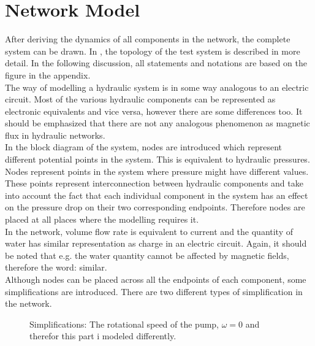 \section{Network Model}  
\label{SystemModel}

After deriving the dynamics of all components in the network, the complete system can be drawn. In , the topology of the test system is described in more detail. In the following discussion, all statements and notations are based on the figure in the appendix. 
\\
The way of modelling a hydraulic system is in some way analogous to an electric circuit. Most of the various hydraulic components can be represented as electronic equivalents and vice versa, however there are some differences too. It should be emphasized that there are not any analogous phenomenon as magnetic flux in hydraulic networks. 
\\
In the block diagram of the system, nodes are introduced which represent different potential points in the system. This is equivalent to hydraulic pressures. Nodes represent points in the system where pressure might have different values. These points represent interconnection between hydraulic components and take into account the fact that each individual component in the system has an effect on the pressure drop on their two corresponding endpoints. Therefore nodes are placed at all places where the modelling requires it. 
\\
In the network, volume flow rate is equivalent to current and the quantity of water has similar representation as charge in an electric circuit. Again, it should be noted that e.g. the water quantity cannot be affected by magnetic fields, therefore the word: similar.
\\ 
Although nodes can be placed across all the endpoints of each component, some simplifications are introduced. There are two different types of simplification in the network. %


\begin{figure}[H]
\centering
   
  \label{fig:subsys_1}
%   
\caption{Simplifications: The rotational speed of the pump, $\omega = 0$ and therefor this part i modeled differently.}
\end{figure}

